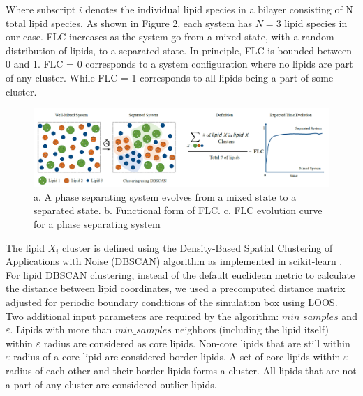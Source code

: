 \documentclass{biophys-new}
\begin{document}
Where subscript $i$ denotes the individual lipid species in a bilayer consisting of N total lipid species.
As shown in Figure 2, each system has $N=3$ lipid species in our case.
FLC increases as the system go from a mixed state, with a random distribution of lipids, to a separated state.
In principle, FLC is bounded between 0 and 1. FLC = 0 corresponds to a system configuration where no lipids are part of any cluster.
While FLC = 1 corresponds to all lipids being a part of some cluster. 

\begin{figure}[hbt!]
\centering
\includegraphics[width=1\linewidth]{Figures/Figure1.PNG}
\caption{a. A phase separating system evolves from a mixed state to a separated state. b. Functional form of FLC. c. FLC evolution curve for a phase separating system}
\label{fig2:view}

\end{figure}


The lipid $X_i$ cluster is defined using the Density-Based Spatial Clustering of Applications with Noise (DBSCAN) algorithm \cite{MartinEsterHans-PeterKriegelJiirgSander1996,Ester2017} as implemented in scikit-learn \cite{PedregosaF.VaroquauxG.GramfortA.MichelV.ThirionB.GriselO.BlondelM.PrettenhoferP.WeissR.andDubourgV.VanderplasJ.PassosA.CournapeauD.BrucherM.PerrotM.Duchesnay2011}.
For lipid DBSCAN clustering, instead of the default euclidean metric to calculate the distance between lipid coordinates, we used a precomputed distance matrix adjusted for periodic boundary conditions of the simulation box using LOOS.
Two additional input parameters are required by the algorithm: $min\_samples$ and $\varepsilon$.
Lipids with more than $min\_samples$ neighbors (including the lipid itself) within $\varepsilon$ radius are considered as core lipids.
Non-core lipids that are still within $\varepsilon$ radius of a core lipid are considered border lipids.
A set of core lipids within $\varepsilon$ radius of each other and their border lipids forms a cluster.
All lipids that are not a part of any cluster are considered outlier lipids.
\end{document}

